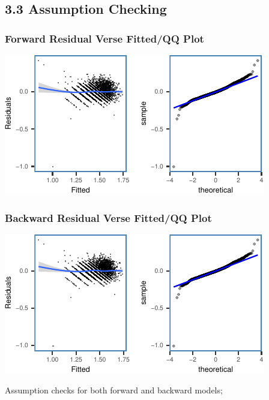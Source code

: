 \documentclass[letterpaper,9pt,twocolumn,twoside,]{pinp}
\begin{document}
\subsection{3.3 Assumption Checking}\label{assumption-checking}

\subsubsection{Forward Residual Verse Fitted/QQ
Plot}\label{forward-residual-verse-fittedqq-plot}

\begin{center}\includegraphics{ExecSum_files/figure-latex/unnamed-chunk-4-1} \end{center}

\subsubsection{Backward Residual Verse Fitted/QQ
Plot}\label{backward-residual-verse-fittedqq-plot}

\begin{center}\includegraphics{ExecSum_files/figure-latex/unnamed-chunk-5-1} \end{center}

Assumption checks for both forward and backward models;
\end{document}
